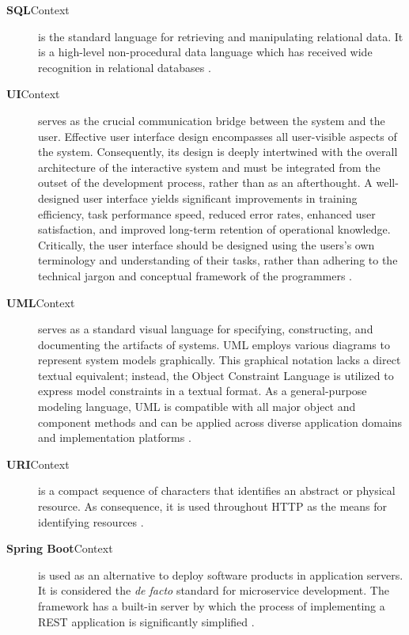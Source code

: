 \begin{description}
\item[\textbf{SQL}Context] is the standard language for retrieving and manipulating relational data.  It is a high-level non-procedural data language which has received wide recognition in relational databases \cite{blacher2022machine, kim1982optimizing}. 

\item[\textbf{UI}Context] serves as the crucial communication bridge between the system and the user. Effective user interface design encompasses all user-visible aspects of the system. Consequently, its design is deeply intertwined with the overall architecture of the interactive system and must be integrated from the outset of the development process, rather than as an afterthought. A well-designed user interface yields significant improvements in training efficiency, task performance speed, reduced error rates, enhanced user satisfaction, and improved long-term retention of operational knowledge. Critically, the user interface should be designed using the users's own terminology and understanding of their tasks, rather than adhering to the technical jargon and conceptual framework of the programmers \cite{jacob2003}.

\item[\textbf{UML}Context] serves as a standard visual language for specifying, constructing, and documenting the artifacts of systems. UML employs various diagrams to represent system models graphically. This graphical notation lacks a direct textual equivalent; instead, the Object Constraint Language is utilized to express model constraints in a textual format. As a general-purpose modeling language, UML is compatible with all major object and component methods and can be applied across diverse application domains and implementation platforms \cite{garcia2004uml, he2006comparison}.

\item[\textbf{URI}Context] is a compact sequence of characters that identifies an abstract or physical resource. As consequence, it is used throughout HTTP as the means for identifying resources \cite{rfc3986, rfc9110}.

\item[\textbf{Spring Boot}Context] is used as an alternative to deploy software products in application servers. It is considered the \textit{de facto} standard for microservice development. The framework has a built-in server by which the process of implementing a REST application is significantly simplified \cite{gomez2020crudyleaf}.

\end{description}